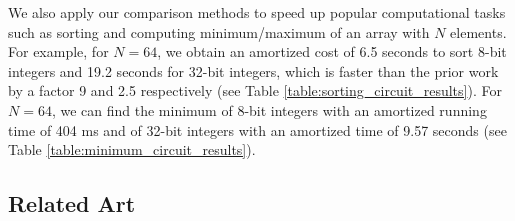 We also apply our comparison methods to speed up popular computational tasks such as sorting and computing minimum/maximum of an array with $N$ elements. 
For example, for $N=64$, we obtain an amortized cost of 6.5 seconds to sort 8-bit integers and 19.2 seconds for 32-bit integers, which is faster than the prior work by a factor 9 and 2.5 respectively (see Table \ref{table:sorting_circuit_results}). 
For $N=64$, we can find the minimum of 8-bit integers with an amortized running time of 404 ms and of 32-bit integers with an amortized time of 9.57 seconds (see Table \ref{table:minimum_circuit_results}).

\subsection{Related Art}
\label{sec:related-art}





